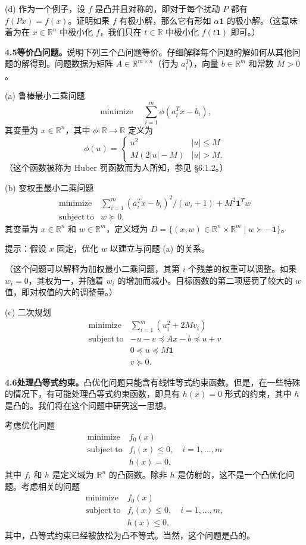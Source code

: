 \documentclass[UTF8, 12pt, fontset=fandol, oneside]{ctexart}
\begin{document}
(d) 作为一个例子，设 $f$ 是凸并且对称的，即对于每个扰动 $P$ 都有 $f(Px)=f(x)$。证明如果 $f$ 有极小解，那么它有形如 $\alpha\mathbf{1}$ 的极小解。（这意味着为在 $x\in\mathbb{R}^n$ 中极小化 $f$，我们只在 $t\in\mathbb{R}$ 中极小化 $f(t\mathbf{1})$ 即可。）

\noindent\textbf{4.5\quad 等价凸问题。}\quad 说明下列三个凸问题等价。仔细解释每个问题的解如何从其他问题的解得到。问题数据为矩阵 $A\in\mathbb{R}^{m\times n}$（行为 $a_i^T$），向量 $b\in\mathbb{R}^m$ 和常数 $M>0$。

(a) 鲁棒最小二乘问题
\[
\mathop{\mathrm{minimize}}\quad \sum_{i=1}^m\phi(a_i^Tx-b_i),
\]
其变量为 $x\in\mathbb{R}^n$，其中 $\phi:\mathbb{R}\to\mathbb{R}$ 定义为
\[
\phi(u)=
\begin{cases}
u^2 & |u|\leq M\\
M(2|u|-M) & |u|>M.
\end{cases}
\]
（这个函数被称为 Huber 罚函数而为人所知，参见 \S6.1.2。）

(b) 变权重最小二乘问题
\[
\begin{array}{ll}
\mathop{\mathrm{minimize}} & \displaystyle\sum_{i=1}^m(a_i^Tx-b_i)^2/(w_i+1)+M^2\mathbf{1}^Tw\\
\mathrm{subject\ to} & w\succeq0,
\end{array}
\]
其变量为 $x\in\mathbb{R}^n$ 和 $w\in\mathbb{R}^m$，定义域为 $D=\{(x,w)\in\mathbb{R}^n\times\mathbb{R}^m\mid w\succ-\mathbf{1}\}$。

提示：假设 $x$ 固定，优化 $w$ 以建立与问题 (a) 的关系。

（这个问题可以解释为加权最小二乘问题，其第 $i$ 个残差的权重可以调整。如果 $w_i=0$，其权为一，并随着 $w_i$ 的增加而减小。目标函数的第二项惩罚了较大的 $w$ 值，即对权值的大的调整量。）

(c) 二次规划
\[
\begin{array}{ll}
\mathop{\mathrm{minimize}} & \displaystyle\sum_{i=1}^m(u_i^2+2Mv_i)\\
\mathrm{subject\ to} & -u-v\preceq Ax-b\preceq u+v\\
& 0\preceq u\preceq M\mathbf{1}\\
& v\succeq0.
\end{array}
\]

\noindent\textbf{4.6\quad 处理凸等式约束。}\quad 凸优化问题只能含有线性等式约束函数。但是，在一些特殊的情况下，有可能处理凸等式约束函数，即具有 $h(x)=0$ 形式的约束，其中 $h$ 是凸的。我们将在这个问题中研究这一思想。

考虑优化问题
\[
\begin{array}{ll}
\mathop{\mathrm{minimize}} & f_0(x)\\
\mathrm{subject\ to} & f_i(x)\leq0,\quad i=1,\ldots,m\\
& h(x)=0,
\end{array}
\tag{4.65}
\]
其中 $f_i$ 和 $h$ 是定义域为 $\mathbb{R}^n$ 的凸函数。除非 $h$ 是仿射的，这不是一个凸优化问题。考虑相关的问题
\[
\begin{array}{ll}
\mathop{\mathrm{minimize}} & f_0(x)\\
\mathrm{subject\ to} & f_i(x)\leq0,\quad i=1,\ldots,m,\\
& h(x)\leq0,
\end{array}
\tag{4.66}
\]
其中，凸等式约束已经被放松为凸不等式。当然，这个问题是凸的。
\end{document}
